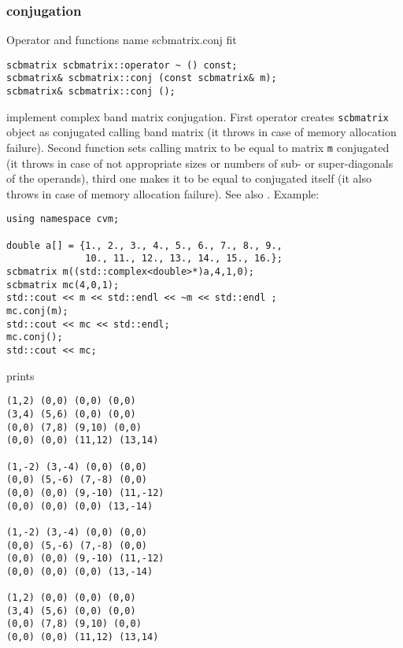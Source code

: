 \subsubsection{conjugation}
Operator and functions%
\pdfdest name {scbmatrix.conj} fit
\begin{verbatim}
scbmatrix scbmatrix::operator ~ () const;
scbmatrix& scbmatrix::conj (const scbmatrix& m);
scbmatrix& scbmatrix::conj ();
\end{verbatim}
implement complex band matrix conjugation.
First operator creates \verb"scbmatrix" object as
 conjugated calling band matrix
(it throws  
in case of memory allocation failure). 
Second function sets  calling matrix to be equal to  matrix
\verb"m" conjugated
(it throws  
in case of not appropriate sizes or numbers of sub- or
super-diagonals of the operands), 
third one makes it to be equal to
conjugated itself (it also throws  
in case of memory allocation failure). 
See also .
Example:
\begin{Verbatim}
using namespace cvm;

double a[] = {1., 2., 3., 4., 5., 6., 7., 8., 9.,
              10., 11., 12., 13., 14., 15., 16.};
scbmatrix m((std::complex<double>*)a,4,1,0);
scbmatrix mc(4,0,1);
std::cout << m << std::endl << ~m << std::endl ;
mc.conj(m);
std::cout << mc << std::endl;
mc.conj();
std::cout << mc;
\end{Verbatim}
prints
\begin{Verbatim}
(1,2) (0,0) (0,0) (0,0)
(3,4) (5,6) (0,0) (0,0)
(0,0) (7,8) (9,10) (0,0)
(0,0) (0,0) (11,12) (13,14)

(1,-2) (3,-4) (0,0) (0,0)
(0,0) (5,-6) (7,-8) (0,0)
(0,0) (0,0) (9,-10) (11,-12)
(0,0) (0,0) (0,0) (13,-14)

(1,-2) (3,-4) (0,0) (0,0)
(0,0) (5,-6) (7,-8) (0,0)
(0,0) (0,0) (9,-10) (11,-12)
(0,0) (0,0) (0,0) (13,-14)

(1,2) (0,0) (0,0) (0,0)
(3,4) (5,6) (0,0) (0,0)
(0,0) (7,8) (9,10) (0,0)
(0,0) (0,0) (11,12) (13,14)
\end{Verbatim}
\newpage





